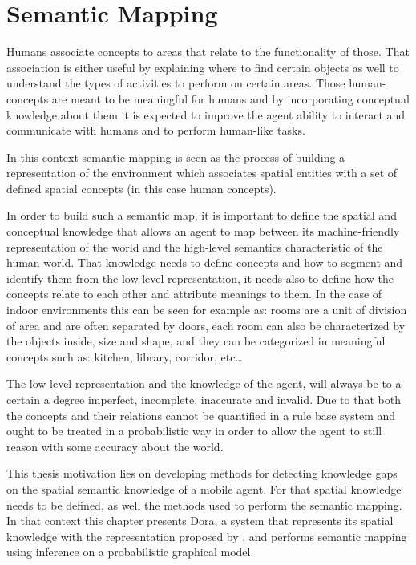 \chapter{Semantic Mapping}\label{chap:semantic-mapping}

Humans associate concepts to areas that relate to the functionality of those. That
association is either useful by explaining where to find certain objects as well to
understand the types of activities to perform on certain areas. 
Those human-concepts are meant to be meaningful for humans and by incorporating conceptual
knowledge about them it is expected to improve the agent ability to interact and communicate
with humans and to perform human-like tasks.

In this context semantic mapping is seen as the process of building a representation of
the environment which associates spatial entities with a set of defined spatial concepts (in this case human concepts).

In order to build such a semantic map, it is important to define the spatial and conceptual knowledge
that allows an agent to map between its machine-friendly representation of the world and the high-level semantics
characteristic of the human world.
That knowledge needs to define concepts and how to segment and identify them from the low-level representation,
it needs also to define how the concepts relate to each other and attribute meanings to them.
In the case of indoor environments this can be seen for example as: rooms are a unit of division of area and are
often separated by doors, each room can also be characterized by the objects inside, size and shape, and they
can be categorized in meaningful concepts such as: kitchen, library, corridor, etc\dots

The low-level representation and the knowledge of the agent, will always be to a certain a degree imperfect,
incomplete, inaccurate and invalid. Due to that both the concepts and their relations
cannot be quantified in a rule base system and ought to be treated in a probabilistic way in order to allow
the agent to still reason with some accuracy about the world.

This thesis motivation lies on developing methods for detecting knowledge gaps on the spatial
semantic knowledge of a mobile agent. For that spatial knowledge needs to be defined, as well
the methods used to perform the semantic mapping.
In that context this chapter presents \gls{Dora}, a system that represents its spatial knowledge
with the representation proposed by \cite{pronobis2010ias}, and performs semantic mapping using
inference on a probabilistic graphical model.


